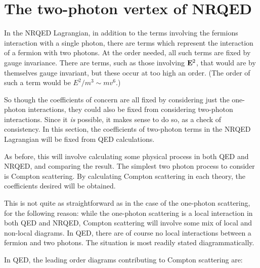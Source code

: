 \section{The two-photon vertex of NRQED}
In the NRQED Lagrangian, in addition to the terms involving the fermions interaction with a single photon, there are terms which represent the interaction of a fermion with two photons.  At the order needed, all such terms are fixed by gauge invariance.  There are terms, such as those involving $\mathbf{E}^2$, that would are by themselves gauge invariant, but these occur at too high an order.  (The order of such a term would be $E^2 / m^3 \sim mv^6$.)

So though the coefficients of concern are all fixed by considering just the one-photon interactions, they could also be fixed from considering two-photon interactions.  Since it \emph{is} possible, it makes sense to do so, as a check of consistency.  In this section, the coefficients of two-photon terms in the NRQED Lagrangian will be fixed from QED calculations.

As before, this will involve calculating some physical process in both QED and NRQED, and comparing the result.  The simplest two photon process to consider is Compton scattering.  By calculating Compton scattering in each theory, the coefficients desired will be obtained.

This is not quite as straightforward as in the case of the one-photon scattering, for the following reason: while the one-photon scattering is a local interaction in both QED and NRQED, Compton scattering will involve some mix of local and non-local diagrams.  In QED, there are of course no local interactions between a fermion and two photons.  The situation is most readily stated diagrammatically.

In QED, the leading order diagrams contributing to Compton scattering are:

